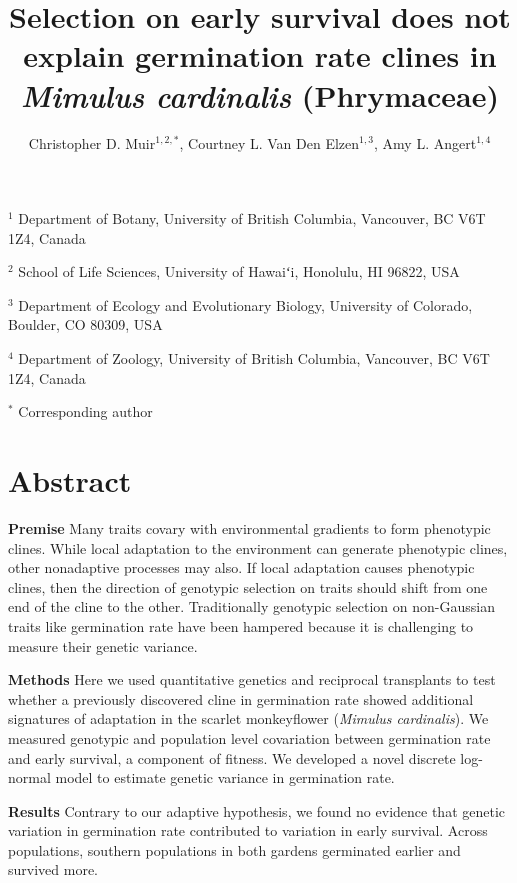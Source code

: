 \documentclass[
  12pt,
]{article}
\title{Selection on early survival does not explain germination rate clines in \emph{Mimulus cardinalis} (Phrymaceae)}
\author{Christopher D. Muir\(^{1,2,*}\), Courtney L. Van Den Elzen\(^{1,3}\), Amy L. Angert\(^{1,4}\)}
\date{}
\makeatletter
\newcommand\iraggedright{%
  \let\\\@centercr\@rightskip\@flushglue \rightskip\@rightskip
  \leftskip\z@skip}
\makeatother
\begin{document}
\maketitle

\iraggedright

\newcommand{\pkg}[1]{{\fontseries{b}\selectfont #1}} 

\(^{1}\) Department of Botany, University of British Columbia, Vancouver, BC V6T 1Z4, Canada

\(^{2}\) School of Life Sciences, University of Hawaiʻi, Honolulu, HI 96822, USA

\(^{3}\) Department of Ecology and Evolutionary Biology, University of Colorado, Boulder, CO 80309, USA

\(^{4}\) Department of Zoology, University of British Columbia, Vancouver, BC V6T 1Z4, Canada

\(^{*}\) Corresponding author

\hypertarget{abstract}{%
\section{Abstract}\label{abstract}}

\textbf{Premise} Many traits covary with environmental gradients to form phenotypic clines. While local adaptation to the environment can generate phenotypic clines, other nonadaptive processes may also. If local adaptation causes phenotypic clines, then the direction of genotypic selection on traits should shift from one end of the cline to the other. Traditionally genotypic selection on non-Gaussian traits like germination rate have been hampered because it is challenging to measure their genetic variance.

\textbf{Methods} Here we used quantitative genetics and reciprocal transplants to test whether a previously discovered cline in germination rate showed additional signatures of adaptation in the scarlet monkeyflower (\emph{Mimulus cardinalis}). We measured genotypic and population level covariation between germination rate and early survival, a component of fitness. We developed a novel discrete log-normal model to estimate genetic variance in germination rate.

\textbf{Results} Contrary to our adaptive hypothesis, we found no evidence that genetic variation in germination rate contributed to variation in early survival. Across populations, southern populations in both gardens germinated earlier and survived more.
\end{document}
